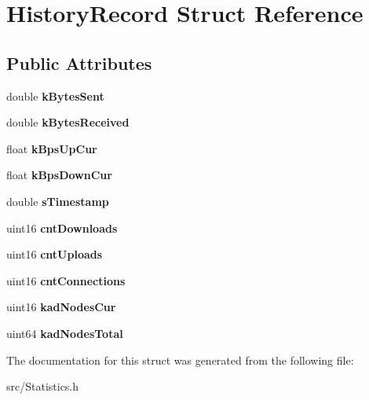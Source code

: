 \section{HistoryRecord Struct Reference}
\label{structHistoryRecord}
\subsection*{Public Attributes}
\begin{DoxyCompactItemize}
\item 
double {\bfseries kBytesSent}\label{structHistoryRecord_a94089a7771d6291dfbc33459723790c6}

\item 
double {\bfseries kBytesReceived}\label{structHistoryRecord_a437f4b156e885363b559bec3260c8352}

\item 
float {\bfseries kBpsUpCur}\label{structHistoryRecord_a913ce6cca4f9345ce1aff5b99ca123cd}

\item 
float {\bfseries kBpsDownCur}\label{structHistoryRecord_a6f07ecce64a56e2392c64d38a509f19a}

\item 
double {\bfseries sTimestamp}\label{structHistoryRecord_a8095a853fa060042f252c0ed9ad18846}

\item 
uint16 {\bfseries cntDownloads}\label{structHistoryRecord_a29293bba3ef014c401ac68a3b8772260}

\item 
uint16 {\bfseries cntUploads}\label{structHistoryRecord_afe03cf9ac093fa79e20bb1565c74cb09}

\item 
uint16 {\bfseries cntConnections}\label{structHistoryRecord_a1275509e62fbbe80be11f81a31b7da40}

\item 
uint16 {\bfseries kadNodesCur}\label{structHistoryRecord_ab77085a907b3a31b89c402052036b48b}

\item 
uint64 {\bfseries kadNodesTotal}\label{structHistoryRecord_a6fd27d635b57a5cc9bfa55069225372f}

\end{DoxyCompactItemize}


The documentation for this struct was generated from the following file:\begin{DoxyCompactItemize}
\item 
src/Statistics.h\end{DoxyCompactItemize}
